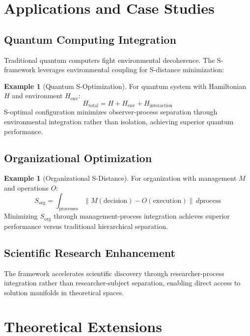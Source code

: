 \documentclass[11pt]{article}
\theoremstyle{definition}
\newtheorem{example}[theorem]{Example}
\theoremstyle{remark}
\begin{document}
\section{Applications and Case Studies}

\subsection{Quantum Computing Integration}

Traditional quantum computers fight environmental decoherence. The S-framework leverages environmental coupling for S-distance minimization:

\begin{example}[Quantum S-Optimization]
For quantum system with Hamiltonian $H$ and environment $H_{\text{env}}$:
\begin{equation}
H_{\text{total}} = H + H_{\text{env}} + H_{\text{interaction}}
\end{equation}
S-optimal configuration minimizes observer-process separation through environmental integration rather than isolation, achieving superior quantum performance.
\end{example}

\subsection{Organizational Optimization}

\begin{example}[Organizational S-Distance]
For organization with management $M$ and operations $O$:
\begin{equation}
S_{\text{org}} = \int_{\text{processes}} \|M(\text{decision}) - O(\text{execution})\| \, d\text{process}
\end{equation}
Minimizing $S_{\text{org}}$ through management-process integration achieves superior performance versus traditional hierarchical separation.
\end{example}

\subsection{Scientific Research Enhancement}

The framework accelerates scientific discovery through researcher-process integration rather than researcher-subject separation, enabling direct access to solution manifolds in theoretical spaces.

\section{Theoretical Extensions}
\end{document}
